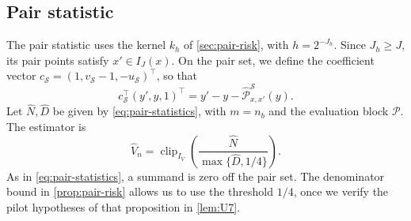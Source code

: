 \subsection*{Pair statistic}
The pair statistic uses the kernel $k_h$ of \cref{sec:pair-risk},
with $h=2^{-J_h}$.
Since $J_h\ge J$, its pair points satisfy $x'\in I_J(x)$.
On the pair set, we define the coefficient vector
$c_{\mathcal S}=(1,v_{\mathcal S}-1,-u_{\mathcal S})^\top$, so that
\[
 c_{\mathcal S}^\top(y',y,1)^\top
 =y'-y-\widehat{\mathcal P}^{\mathcal S}_{x,x'}(y).
\]
Let $\widehat N,\widehat D$ be given by \eqref{eq:pair-statistics},
with $m=n_b$ and the evaluation block $\mathcal P$. The estimator is
\begin{equation}\label{eq:Udef-estimator}
 \widehat V_n=\operatorname{clip}_{I_V}
       \left(\frac{\widehat N}{\max\{\widehat D,1/4\}}\right).
\end{equation}
As in \eqref{eq:pair-statistics}, a summand is zero off the pair set.
The denominator bound in \cref{prop:pair-risk} allows us to use the
threshold $1/4$, once we verify the pilot hypotheses of that
proposition in \cref{lem:U7}.

